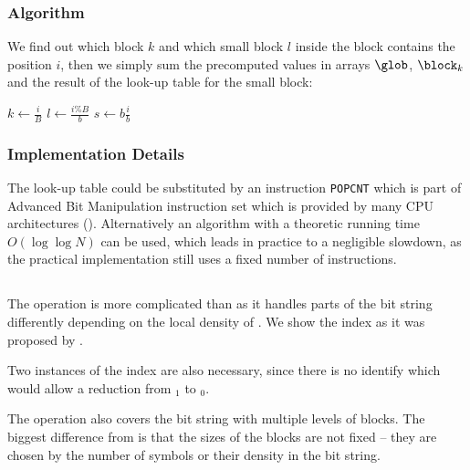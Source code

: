 \subsubsection{Algorithm}

We find out which block $k$ and which small block $l$ inside the block contains the position $i$, then we simply sum the precomputed values in arrays $\glob$, $\block_k$ and the result of the look-up table for the small block:
\begin{algorithm}
\begin{algorithmic}
	\State $k \gets \frac{i}{B}$%
	\Instr $l \gets \frac{i \% B}{b}$%
	\Instr $s \gets b \frac{i}{b}$
	\State{}
\EndFunction
\end{algorithmic}
\end{algorithm}

\subsubsection{Implementation Details}

The look-up table could be substituted by an instruction \verb|POPCNT| which is part of Advanced Bit Manipulation instruction set which is provided by many CPU architectures (\cite{intelsys}).
Alternatively an algorithm with a theoretic running time $O(\log \log N)$ can be used, which leads in practice to a negligible slowdown, as the practical implementation still uses a fixed number of instructions.

\subsection{\select}\label{ss:select}

The operation \select{} is more complicated than \rank{} as it handles parts of the bit string differently depending on the local density of \ph{}.
We show the index as it was proposed by \cite{clark1998compact}.

Two instances of the index are also necessary, since there is no identify which would allow a reduction from \select$_1$ to \select$_0$.

\bigbreak

The \select{} operation also covers the bit string with multiple levels of blocks.
The biggest difference from \rank{} is that the sizes of the blocks are not fixed -- they are chosen by the number of symbols \ph{} or their density in the bit string.


